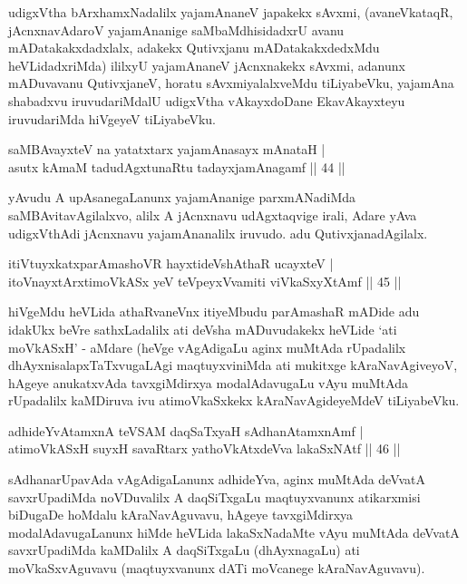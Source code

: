 \begin{artha}
udigxVtha bArxhamxNadalilx yajamAnaneV japakekx sAvxmi, (avaneVkataqR, \-jAcnxnavAdaroV yajamAnanige saMbaMdhisidadxrU avanu mADatakakxdadxlalx, adakekx Qutivxjanu mADatakakxdedxMdu heVLidadxriMda) ililxyU yajamAnaneV jAcnxnakekx sAvxmi, adanunx mADuvavanu QutivxjaneV, horatu sAvxmiyalalxveMdu tiLiyabeVku, yajamAna shabadxvu iruvudariMdalU udigxVtha vAkayxdoDane EkavAkayxteyu iruvudariMda hiVgeyeV tiLiyabeVku.
\end{artha}

\begin{shl}
saMBAvayxteV na yatatxtarx yajamAnasayx mAnataH |\\
asutx kAmaM tadudAgxtunaRtu tadayxjamAnagamf \hfill || 44 ||
\end{shl}

\begin{artha}
yAvudu A upAsanegaLanunx yajamAnanige parxmANadiMda saMBAvita\-vAgilalxvo, alilx A jAcnxnavu udAgxtaqvige irali, Adare yAva udigxVthAdi jAcnxnavu yajamAnanalilx iruvudo. adu QutivxjanadAgilalx.
\end{artha}

\begin{shl}
itiVtuyxkatxparAmashoVR hayxtideVshAthaR ucayxteV |\\
itoV\s nayxtArxtimoVkASx yeV teV\s peyxVvamiti viVkaSxyXtAmf \hfill || 45 ||
\end{shl}

\begin{artha}
hiVgeMdu heVLida athaRvaneVnx itiyeMbudu parAmashaR mADide adu idakUkx beVre sathxLadalilx ati deVsha mADuvudakekx heVLide `ati moVkASxH' - aMdare (heVge vAgAdigaLu aginx muMtAda rUpadalilx dhAyxnisalapxTaTxvugaLAgi maqtuyxviniMda ati mukitxge kAraNavAgiveyoV, hAgeye anukatxvAda tavxgiMdirxya modalAdavugaLu vAyu muMtAda rUpadalilx kaMDiruva ivu atimoVkaSxkekx kAraNavAgideyeMdeV tiLiyabeVku.
\end{artha}


\begin{shl}
adhideYvAtamxnA teVSAM daqSaTxyaH sAdhanAtamxnAmf |\\
atimoVkASxH suyxH savaRtarx yathoVkAtxdeVva lakaSxNAtf \hfill || 46 ||
\end{shl}

\begin{artha}
sAdhanarUpavAda vAgAdigaLanunx adhideYva, aginx muMtAda deVvatA savxrUpadiMda noVDuvalilx A daqSiTxgaLu maqtuyxvanunx atikarxmisi biDugaDe hoMdalu kAraNavAguvavu, hAgeye tavxgiMdirxya modalAdavugaLanunx hiMde heVLida lakaSxNadaMte vAyu muMtAda deVvatA savxrUpadiMda kaMDalilx A daqSiTxgaLu (dhAyxnagaLu) ati moVkaSxvAguvavu (maqtuyxvanunx dATi moVcanege kAraNavAguvavu).
\end{artha}

